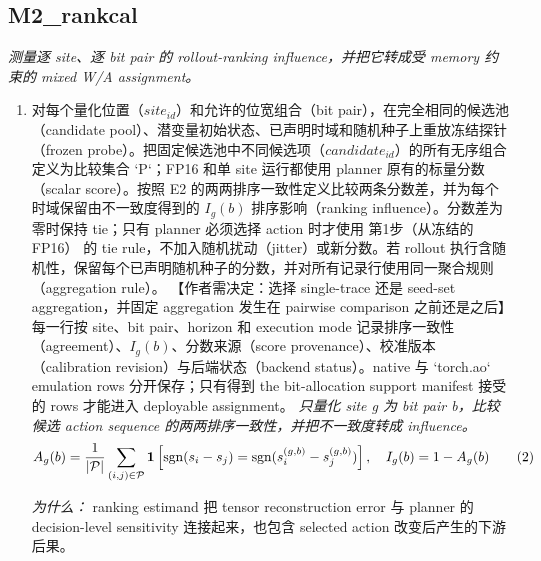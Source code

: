 \documentclass[10pt,a4paper]{article}
\begin{document}
\subsection*{M2\_rankcal}
\emph{测量逐 site、逐 bit pair 的 rollout-ranking influence，并把它转成受 memory 约束的 mixed W/A assignment。}
\begin{enumerate}[leftmargin=*,start=2]
  \item 对每个量化位置（\(site_{id}\)）和允许的位宽组合（bit pair），在完全相同的候选池（candidate pool）、潜变量初始状态、已声明时域和随机种子上重放冻结探针（frozen probe）。把固定候选池中不同候选项（\(candidate_{id}\)）的所有无序组合定义为比较集合 `P`；FP16 和单 site 运行都使用 planner 原有的标量分数（scalar score）。按照 E2 的两两排序一致性定义比较两条分数差，并为每个时域保留由不一致度得到的 \(I_{g}(b)\) 排序影响（ranking influence）。分数差为零时保持 tie；只有 planner 必须选择 action 时才使用 第1步（从冻结的 FP16） 的 tie rule，不加入随机扰动（jitter）或新分数。若 rollout 执行含随机性，保留每个已声明随机种子的分数，并对所有记录行使用同一聚合规则（aggregation rule）。 【作者需决定：选择 single-trace 还是 seed-set aggregation，并固定 aggregation 发生在 pairwise comparison 之前还是之后】 每一行按 site、bit pair、horizon 和 execution mode 记录排序一致性（agreement）、\(I_{g}(b)\)、分数来源（score provenance）、校准版本（calibration revision）与后端状态（backend status）。native 与 `torch.ao` emulation rows 分开保存；只有得到 the bit-allocation support manifest 接受的 rows 才能进入 deployable assignment。
\noindent\emph{只量化 site g 为 bit pair b，比较候选 action sequence 的两两排序一致性，并把不一致度转成 influence。}
\begin{equation}
\resizebox{\ifdim\width>\linewidth \linewidth\else\width\fi}{!}{$\displaystyle A_g(b)=\frac{1}{|\mathcal{P}|}\sum_{(i,j)\in\mathcal{P}}\mathbf{1}\left[\operatorname{sgn}(s_i-s_j)=\operatorname{sgn}(s_i^{(g,b)}-s_j^{(g,b)})\right],\quad I_g(b)=1-A_g(b)$} \tag{2}
\end{equation}
\par\emph{为什么：} ranking estimand 把 tensor reconstruction error 与 planner 的 decision-level sensitivity 连接起来，也包含 selected action 改变后产生的下游后果。

\end{enumerate}
\end{document}
